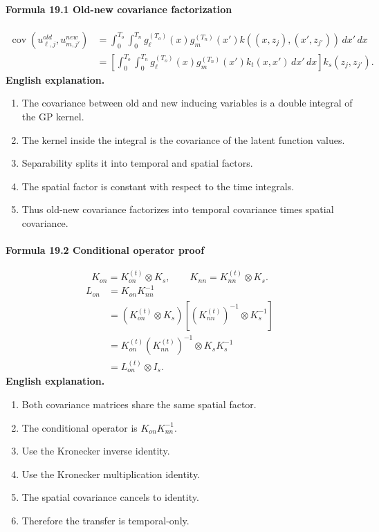 \documentclass[12pt]{article}
\begin{document}
\paragraph{Formula 19.1 Old-new covariance factorization}
\[
\begin{aligned}
\operatorname{cov}(u_{\ell,j}^{old},u_{m,j'}^{new})
&=
\int_0^{T_o}\int_0^{T_n}
g_\ell^{(T_o)}(x)g_m^{(T_n)}(x')
k((x,z_j),(x',z_{j'}))\,dx'\,dx\\
&=
\left[
\int_0^{T_o}\int_0^{T_n}
g_\ell^{(T_o)}(x)g_m^{(T_n)}(x')k_t(x,x')\,dx'\,dx
\right]
k_s(z_j,z_{j'}).
\end{aligned}
\]
\textbf{English explanation.}
\begin{enumerate}[leftmargin=2em]
\item The covariance between old and new inducing variables is a double integral of the GP kernel.
\item The kernel inside the integral is the covariance of the latent function values.
\item Separability splits it into temporal and spatial factors.
\item The spatial factor is constant with respect to the time integrals.
\item Thus old-new covariance factorizes into temporal covariance times spatial covariance.
\end{enumerate}

\paragraph{Formula 19.2 Conditional operator proof}
\[
K_{on}=K_{on}^{(t)}\otimes K_s,
\qquad
K_{nn}=K_{nn}^{(t)}\otimes K_s.
\]
\[
\begin{aligned}
L_{on}
&=K_{on}K_{nn}^{-1}\\
&=(K_{on}^{(t)}\otimes K_s)
\left[(K_{nn}^{(t)})^{-1}\otimes K_s^{-1}\right]\\
&=K_{on}^{(t)}(K_{nn}^{(t)})^{-1}\otimes K_sK_s^{-1}\\
&=L_{on}^{(t)}\otimes I_s.
\end{aligned}
\]
\textbf{English explanation.}
\begin{enumerate}[leftmargin=2em]
\item Both covariance matrices share the same spatial factor.
\item The conditional operator is \(K_{on}K_{nn}^{-1}\).
\item Use the Kronecker inverse identity.
\item Use the Kronecker multiplication identity.
\item The spatial covariance cancels to identity.
\item Therefore the transfer is temporal-only.
\end{enumerate}
\end{document}
